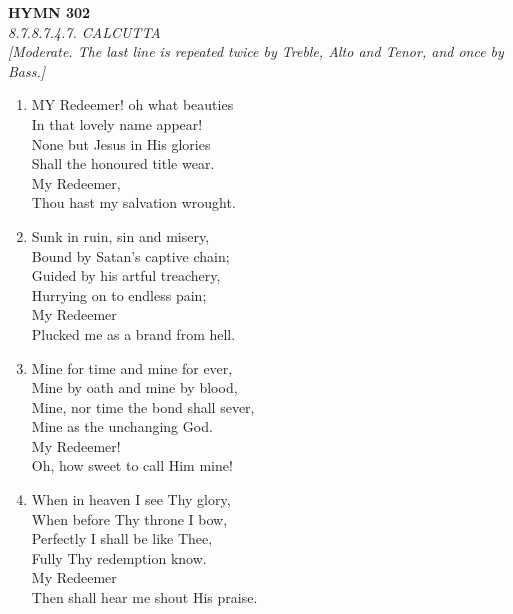 \newpage
\begin{center}
    {\Large \textbf{HYMN 302}}
    \\
    \textit{8.7.8.7.4.7. CALCUTTA}
    \\
    \textit{\small [Moderate. The last line is repeated twice by Treble, Alto and Tenor, and once by Bass.]}
\end{center}
\vspace{1em}

\begin{enumerate}
    \item MY Redeemer! oh what beauties \\
        In that lovely name appear! \\
        None but Jesus in His glories \\
        Shall the honoured title wear. \\
        My Redeemer, \\
        Thou hast my salvation wrought.

    \item Sunk in ruin, sin and misery, \\
        Bound by Satan's captive chain; \\
        Guided by his artful treachery, \\
        Hurrying on to endless pain; \\
        My Redeemer \\
        Plucked me as a brand from hell.

    \item Mine for time and mine for ever, \\
        Mine by oath and mine by blood, \\
        Mine, nor time the bond shall sever, \\
        Mine as the unchanging God. \\
        My Redeemer! \\
        Oh, how sweet to call Him mine!

    \item When in heaven I see Thy glory, \\
        When before Thy throne I bow, \\
        Perfectly I shall be like Thee, \\
        Fully Thy redemption know. \\
        My Redeemer \\
        Then shall hear me shout His praise.

\end{enumerate}

